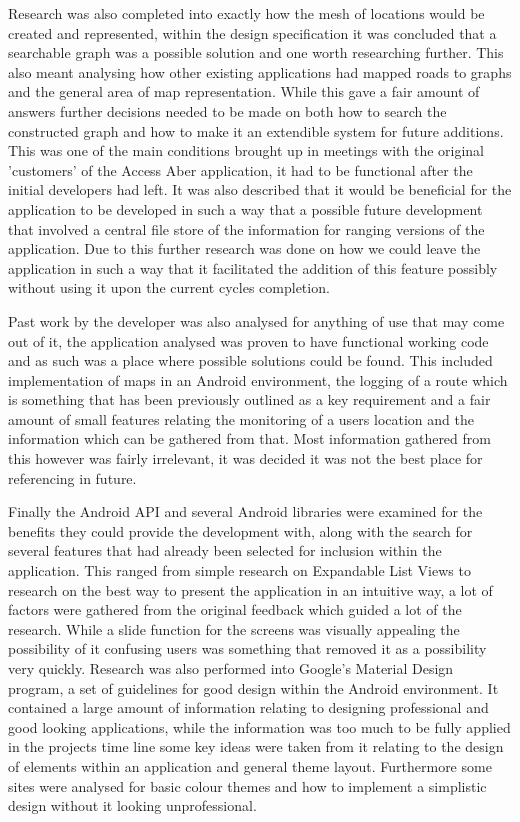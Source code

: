 Research was also completed into exactly how the mesh of locations would be created and represented, within the design specification it was concluded that a searchable graph was a possible solution and one worth researching further. This also meant analysing how other existing applications had mapped roads to graphs and the general area of map representation. While this gave a fair amount of answers further decisions needed to be made on both how to search the constructed graph and how to make it an extendible system for future additions. This was one of the main conditions brought up in meetings with the original 'customers' of the Access Aber application, it had to be functional after the initial developers had left. It was also described that it would be beneficial for the application to be developed in such a way that a possible future development that involved a central file store of the information for ranging versions of the application. Due to this further research was done on how we could leave the application in such a way that it facilitated the addition of this feature possibly without using it upon the current cycles completion. 

Past work by the developer was also analysed for anything of use that may come out of it, the application analysed was proven to have functional working code and as such was a place where possible solutions could be found. This included implementation of maps in an Android environment, the logging of a route which is something that has been previously outlined as a key requirement and a fair amount of small features relating the monitoring of a users location and the information which can be gathered from that. Most information gathered from this however was fairly irrelevant, it was decided it was not the best place for referencing in future. 

Finally the Android API and several Android libraries were examined for the benefits they could provide the development with, along with the search for several features that had already been selected for inclusion within the application. This ranged from simple research on Expandable List Views to research on the best way to present the application in an intuitive way, a lot of factors were gathered from the original feedback which guided a lot of the research. While a slide function for the screens was visually appealing the possibility of it confusing users was something that removed it as a possibility very quickly. Research was also performed into Google's Material Design program, a set of guidelines for good design within the Android environment. It contained a large amount of information relating to designing professional and good looking applications, while the information was too much to be fully applied in the projects time line some key ideas were taken from it relating to the design of elements within an application and general theme layout. Furthermore some sites were analysed for basic colour themes and how to implement a simplistic design without it looking unprofessional.

